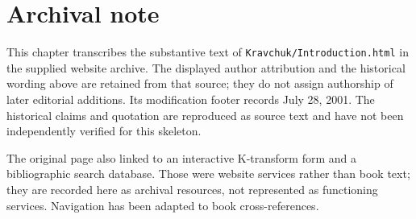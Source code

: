 \section*{Archival note}
This chapter transcribes the substantive text of \texttt{Kravchuk/Introduction.html} in the supplied website archive. The displayed author attribution and the historical wording above are retained from that source; they do not assign authorship of later editorial additions. Its modification footer records July 28, 2001. The historical claims and quotation are reproduced as source text and have not been independently verified for this skeleton.

The original page also linked to an interactive K-transform form and a bibliographic search database. Those were website services rather than book text; they are recorded here as archival resources, not represented as functioning services. Navigation has been adapted to book cross-references.
